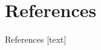 \section{References}
\begin{frame}[allowframebreaks]{References}
    \nocite{*}
    [text] %
    
    
\end{frame}
